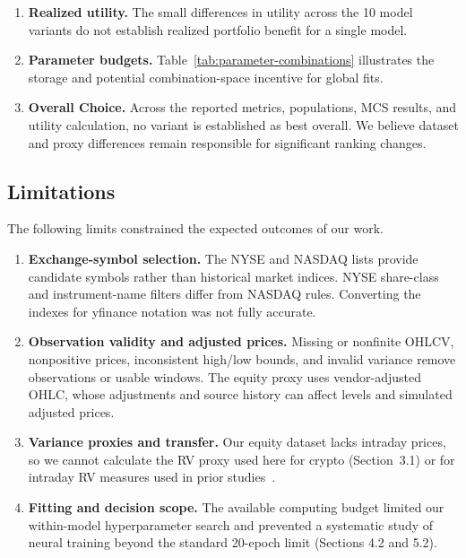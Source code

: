 \documentclass[12pt,a4paper]{article}
\numberwithin{equation}{section}
\numberwithin{table}{section}
\numberwithin{figure}{section}
\begin{document}
\begin{enumerate}
    \item \textbf{Realized utility.} The small differences in utility across the 10 model variants do not establish realized portfolio benefit for a single model. 
    \item \textbf{Parameter budgets.} Table~\ref{tab:parameter-combinations} illustrates the storage and potential combination-space incentive for global fits.
    \item \textbf{Overall Choice.} Across the reported metrics, populations, MCS results, and utility calculation, no variant is established as best overall. We believe dataset and proxy differences remain responsible for significant ranking changes.
\end{enumerate}


\subsection{Limitations}
The following limits constrained the expected outcomes of our work.
\begin{enumerate}
    \item \textbf{Exchange-symbol selection.} The NYSE and NASDAQ lists provide candidate symbols rather than historical market indices. NYSE share-class and instrument-name filters differ from NASDAQ rules. Converting the indexes for yfinance notation was not fully accurate. 
    \item \textbf{Observation validity and adjusted prices.} Missing or nonfinite OHLCV, nonpositive prices, inconsistent high/low bounds, and invalid variance remove observations or usable windows. The equity proxy uses vendor-adjusted OHLC, whose adjustments and source history can affect levels and simulated adjusted prices.
    \item \textbf{Variance proxies and transfer.} Our equity dataset lacks intraday prices, so we cannot calculate the RV proxy used here for crypto (Section~3.1) or for intraday RV measures used in prior studies~\cite{reisenhofer2022,zhang2022}.
    \item \textbf{Fitting and decision scope.} The available computing budget limited our within-model hyperparameter search and prevented a systematic study of neural training beyond the standard 20-epoch limit (Sections 4.2 and 5.2).
\end{enumerate}
\end{document}
